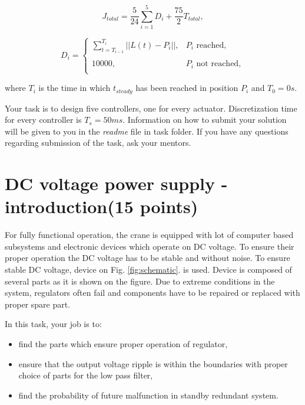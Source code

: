 \documentclass{article}
\begin{document}
	\begin{equation} \label{eq:total_cost}
	J_{total} = \frac{5}{24}\sum_{i=1}^{5} D_i + \frac{75}{2} T_{total},
	\end{equation}
	
	\begin{equation} \label{eq:distance_cost}
	D_i = \left\{
	\begin{array}{ll}
	\sum_{t=T_{i-1}}^{T_{i}} ||L(t) - P_i||, &  P_i \textrm{ reached}, \\
	& \\
	10000, &  P_i \textrm{ not reached},\\
	\end{array} 
	\right.
	\end{equation}
	
	\noindent
	where $T_i$ is the time in which $t_{steady}$ has been reached in position $P_i$ and $T_0 = 0s$.
	
	\vspace{10pt}
	\noindent
	Your task is to design five controllers, one for every actuator. 
	Discretization time for every controller is $T_s = 50ms$. Information on 
	how to submit your solution will be given to you in the \textit{readme} 
	file in task folder. If you have any questions regarding submission of the 
	task, ask your mentors.
	
\newpage
\section{DC voltage power supply - introduction(15 points)}


For fully functional operation, the crane is equipped with 
lot of computer based subsystems and electronic devices which operate on DC 
voltage. To ensure their proper operation the DC voltage has to be stable and 
without noise. To ensure stable DC voltage, device on Fig. 
\ref{fig:schematic}. is used. Device is composed of several parts as it is 
shown on the figure. Due to extreme conditions in the system, regulators often 
fail and components have to be repaired or replaced with proper spare part.

In this task, your job is to:
\begin{itemize}
	\item find the parts which ensure proper operation of regulator, 
	\item ensure that the output voltage ripple is within the boundaries with 
	proper choice of parts for the low pass filter,
	\item find the probability of future malfunction in standby redundant 
	system.
\end{itemize}
\end{document}
